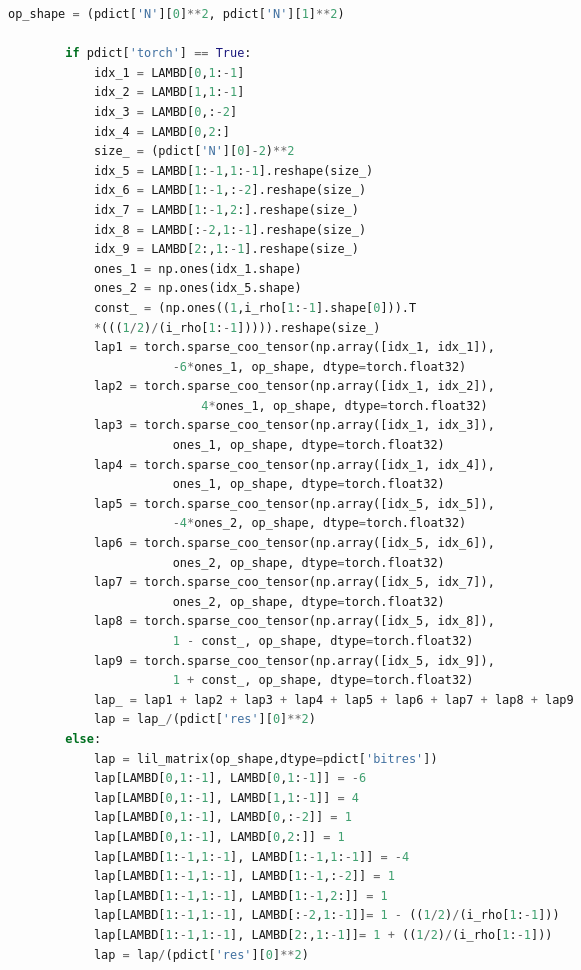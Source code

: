 \begin{spacing}{1.2}
\begin{lstlisting}[frame=single, language=Python]
        op_shape = (pdict['N'][0]**2, pdict['N'][1]**2)
        
        if pdict['torch'] == True:
            idx_1 = LAMBD[0,1:-1]
            idx_2 = LAMBD[1,1:-1]
            idx_3 = LAMBD[0,:-2]
            idx_4 = LAMBD[0,2:]
            size_ = (pdict['N'][0]-2)**2
            idx_5 = LAMBD[1:-1,1:-1].reshape(size_)
            idx_6 = LAMBD[1:-1,:-2].reshape(size_)
            idx_7 = LAMBD[1:-1,2:].reshape(size_)
            idx_8 = LAMBD[:-2,1:-1].reshape(size_)
            idx_9 = LAMBD[2:,1:-1].reshape(size_)
            ones_1 = np.ones(idx_1.shape)
            ones_2 = np.ones(idx_5.shape)
            const_ = (np.ones((1,i_rho[1:-1].shape[0])).T
		    *(((1/2)/(i_rho[1:-1])))).reshape(size_)
            lap1 = torch.sparse_coo_tensor(np.array([idx_1, idx_1]), 
					   -6*ones_1, op_shape, dtype=torch.float32)
            lap2 = torch.sparse_coo_tensor(np.array([idx_1, idx_2]), 
			         	   4*ones_1, op_shape, dtype=torch.float32)
            lap3 = torch.sparse_coo_tensor(np.array([idx_1, idx_3]), 
					   ones_1, op_shape, dtype=torch.float32)
            lap4 = torch.sparse_coo_tensor(np.array([idx_1, idx_4]), 
					   ones_1, op_shape, dtype=torch.float32)
            lap5 = torch.sparse_coo_tensor(np.array([idx_5, idx_5]), 
					   -4*ones_2, op_shape, dtype=torch.float32)
            lap6 = torch.sparse_coo_tensor(np.array([idx_5, idx_6]), 
					   ones_2, op_shape, dtype=torch.float32)
            lap7 = torch.sparse_coo_tensor(np.array([idx_5, idx_7]), 
					   ones_2, op_shape, dtype=torch.float32)
            lap8 = torch.sparse_coo_tensor(np.array([idx_5, idx_8]), 
					   1 - const_, op_shape, dtype=torch.float32)
            lap9 = torch.sparse_coo_tensor(np.array([idx_5, idx_9]), 
					   1 + const_, op_shape, dtype=torch.float32)
            lap_ = lap1 + lap2 + lap3 + lap4 + lap5 + lap6 + lap7 + lap8 + lap9
            lap = lap_/(pdict['res'][0]**2)  
        else:
            lap = lil_matrix(op_shape,dtype=pdict['bitres'])
            lap[LAMBD[0,1:-1], LAMBD[0,1:-1]] = -6
            lap[LAMBD[0,1:-1], LAMBD[1,1:-1]] = 4
            lap[LAMBD[0,1:-1], LAMBD[0,:-2]] = 1
            lap[LAMBD[0,1:-1], LAMBD[0,2:]] = 1
            lap[LAMBD[1:-1,1:-1], LAMBD[1:-1,1:-1]] = -4
            lap[LAMBD[1:-1,1:-1], LAMBD[1:-1,:-2]] = 1
            lap[LAMBD[1:-1,1:-1], LAMBD[1:-1,2:]] = 1
            lap[LAMBD[1:-1,1:-1], LAMBD[:-2,1:-1]]= 1 - ((1/2)/(i_rho[1:-1]))
            lap[LAMBD[1:-1,1:-1], LAMBD[2:,1:-1]]= 1 + ((1/2)/(i_rho[1:-1]))
            lap = lap/(pdict['res'][0]**2)
        

\end{lstlisting}
\end{spacing}
